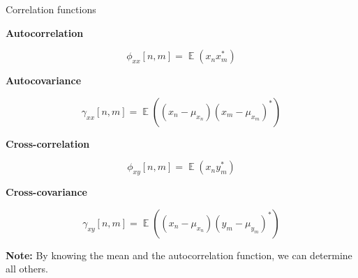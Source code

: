 \documentclass[10pt, handout]{beamer}
\DeclareMathOperator{\E}{\mathbb{E}} %
\begin{document}
\begin{frame}{Correlation functions}

\textbf{Autocorrelation}

\begin{equation*}
\phi_{xx}[n, m] = \E(x_nx_m^*) 
\end{equation*}

\textbf{Autocovariance}

\begin{equation*}
\gamma_{xx}[n, m] = \E((x_n-\mu_{x_n})(x_m - \mu_{x_m})^*) 
\end{equation*}

\textbf{Cross-correlation}

\begin{equation*}
\phi_{xy}[n, m] = \E(x_ny_m^*) 
\end{equation*}

\textbf{Cross-covariance}

\begin{equation*}
\gamma_{xy}[n, m] = \E((x_n-\mu_{x_n})(y_m - \mu_{y_m})^*) 
\end{equation*}

\textbf{Note:} By knowing the mean and the autocorrelation function, we can determine all others.

\end{frame}
\end{document}
